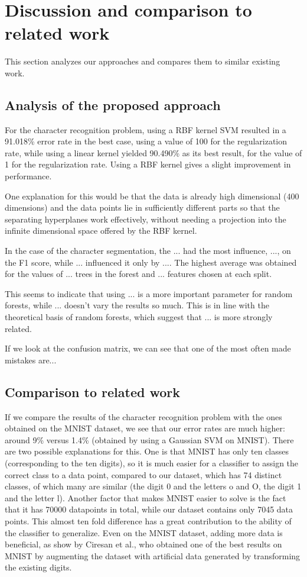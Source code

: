 \section{Discussion and comparison to related work}

This section analyzes our approaches and compares them to similar existing work.

\subsection{Analysis of the proposed approach}
For the character recognition problem, using a RBF kernel SVM resulted in a 91.018\%  error rate in the best case, using a value of 100 for the regularization rate, while using a linear kernel yielded 90.490\%  as its best result, for the value of 1 for the regularization rate. Using a RBF kernel gives a slight improvement in performance.

One explanation for this would be that the data is already high dimensional (400 dimensions) and the data points lie in sufficiently different parts so that the separating hyperplanes work effectively, without needing a projection into the infinite dimensional space offered by the RBF kernel. 

In the case of the character segmentation, the ... had the most influence, ..., on the F1 score, while ... influenced it only by .... The highest average was obtained for the values of ... trees in the forest and ... features chosen at each split. 

This seems to indicate that using ... is a more important parameter for random forests, while ... doesn't vary the results so much. This is in line with the theoretical basis of random forests, which suggest that ... is more strongly related. 

If we look at the confusion matrix, we can see that one of the most often made mistakes are...

\subsection{Comparison to related work}
If we compare the results of the character recognition problem with the ones obtained on the MNIST dataset\cite{lecun1998mnist}, we see that our error rates are much higher: around 9\% versus 1.4\% (obtained by using a Gaussian SVM on MNIST). There are two possible explanations for this. One is that MNIST has only ten classes (corresponding to the ten digits), so it is much easier for a classifier to assign the correct class to a data point, compared to our dataset, which has 74 distinct classes, of which many are similar (the digit 0 and the letters o and O, the digit 1 and the letter l). Another factor that makes MNIST easier to solve is the fact that it has 70000 datapoints in total, while our dataset contains only 7045 data points. This almost ten fold difference has a great contribution to the ability of the classifier to generalize. Even on the MNIST dataset, adding more data is beneficial, as show by Ciresan et al.\cite{Cire_an_2010}, who obtained one of the best results on MNIST by augmenting the dataset with artificial data generated by transforming the existing digits. 

